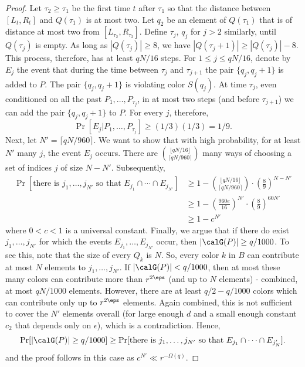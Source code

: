 \documentclass{article}
\begin{document}
\begin{proof}
Let $\tau_2 \geq \tau_1$ be the first time $t$ after $\tau_1$ so that the distance between $[L_t
, R_t
]$ and $Q(\tau_1)$ is at most
two. Let $q_2$ be an element of $Q(\tau_1)$ that is of distance at most two from $[L_{\tau_2}
, R_{\tau_2}
]$.
Define $\tau_j$, $q_j$ for $j > 2$ similarly, until $Q(\tau_j )$ is empty. As long as $|Q(\tau_j )| \geq 8$, we have $|Q(\tau_j+1)| \geq
|Q(\tau_j )| - 8$. This process, therefore, has at least $qN/16$ steps.
For $1 \leq j \leq qN/16$, denote by $E_j$ the event that during the time between $\tau_j$ and $\tau_{j+1}$ the pair
$\{q_j , q_j + 1\}$ is added to $P$. The pair $\{q_j , q_j + 1\}$ is violating color $S(q_j)$. At time $\tau_j$, even conditioned
on all the past $P_1, \ldots , P_{\tau_j}$, in at most two steps (and before $\tau_{j+1}$) we can add the pair $\{q_j , q_j + 1\}$
to $P$. For every $j$, therefore,
\[
\Pr[E_j |P_1,\ldots , P_{\tau_j}] \geq (1/3)(1/3) = 1/9.
\]
Next, let $N' = \lceil qN/960\rceil$. We want to show that with high probability,  for at least $N'$ many $j$, the event $E_j$ occurs. There are $\binom{\lfloor qN/16\rfloor}{\lceil qN/960 \rceil}$ many ways of choosing a set of indices $j$ of size $N-N'$. Subsequently,
\begin{align*}
\Pr[\text{there is $j_1,\ldots , j_{N'}$ so that $E_{j_1}\cap \cdots \cap E_{j_{N'}}$}] &\geq  1 - \binom{\lfloor qN/16\rfloor}{\lceil qN/960 \rceil}\cdot \left(\frac{8}{9}\right)^{N-N'}\\
&\geq 1 - \left(\frac{960e}{16}\right)^{N'}\cdot \left(\frac{8}{9}\right)^{60N'}\\
&\geq 1 - c^{N'}
\end{align*}
where $0< c < 1$ is a universal constant. Finally, we argue that if there do exist $j_1,\ldots , j_{N'}$ for which the events $E_{j_1},\ldots, E_{j_{N'}}$ occur, then $|\calG(P)|\geq q/1000$. To see this, note that the size of every $Q_k$ is $N$. So, every color $k$ in $B$ can contribute at most $N$ elements to
$j_1, \ldots , j_{N'}$. If $|\calG(P)|<q/1000$, then at most these many colors can contribute more than $r^{2\eps}$ (and up to $N$ elements) - combined, at most $qN/1000$ elements. However, there are at least $q/2 - q/1000$ colors which can contribute only up to $r^{2\eps}$ elements. Again combined, this is not sufficient to cover the $N'$ elements overall (for large enough $d$ and a small enough constant $c_2$ that depends only on $\epsilon$), which is a contradiction. Hence,
\[
\Pr[|\calG(P)| \geq q/1000] \geq \Pr[\text{there is $j_1,\ldots , j_{N'}$ so that $E_{j_1}\cap \cdots \cap E_{j_N'}$}].
\]
and the proof follows in this case as $c^{N'}\ll r^{-\Omega(q)}$.


\end{proof}
\end{document}
